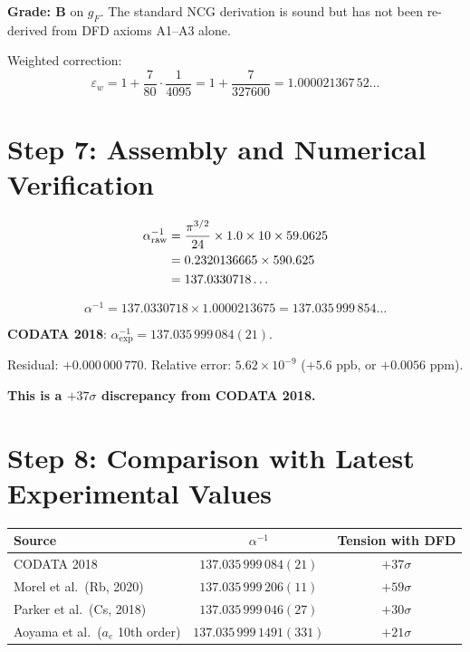 \documentclass[11pt,a4paper]{article}
\begin{document}
\textbf{Grade: B} on $g_F$. The standard NCG derivation is sound but has not been re-derived from DFD axioms A1--A3 alone.

Weighted correction:
\begin{equation}
\varepsilon_w = 1 + \frac{7}{80} \cdot \frac{1}{4095} = 1 + \frac{7}{327600} = 1.000021367\,52\ldots
\end{equation}

\section{Step 7: Assembly and Numerical Verification}

\begin{align}
\alpha^{-1}_{\mathrm{raw}} &= \frac{\pi^{3/2}}{24} \times 1.0 \times 10 \times 59.0625 \notag\\
&= 0.2320136665 \times 590.625 \notag\\
&= 137.0330718\ldots
\end{align}

\begin{equation}
\alpha^{-1} = 137.0330718 \times 1.0000213675 = 137.035\,999\,854\ldots
\end{equation}

\textbf{CODATA 2018}: $\alpha^{-1}_{\mathrm{exp}} = 137.035\,999\,084(21)$.

Residual: $+0.000\,000\,770$. Relative error: $5.62 \times 10^{-9}$ ($+5.6$ ppb, or $+0.0056$ ppm).

\textbf{This is a $+37\sigma$ discrepancy from CODATA 2018.}

\section{Step 8: Comparison with Latest Experimental Values}

\begin{center}
\begin{tabular}{lcc}
\toprule
\textbf{Source} & $\alpha^{-1}$ & \textbf{Tension with DFD} \\
\midrule
CODATA 2018 & $137.035\,999\,084(21)$ & $+37\sigma$ \\
Morel et al.\ (Rb, 2020) & $137.035\,999\,206(11)$ & $+59\sigma$ \\
Parker et al.\ (Cs, 2018) & $137.035\,999\,046(27)$ & $+30\sigma$ \\
Aoyama et al.\ ($a_e$ 10th order) & $137.035\,999\,1491(331)$ & $+21\sigma$ \\
\bottomrule
\end{tabular}
\end{center}
\end{document}
